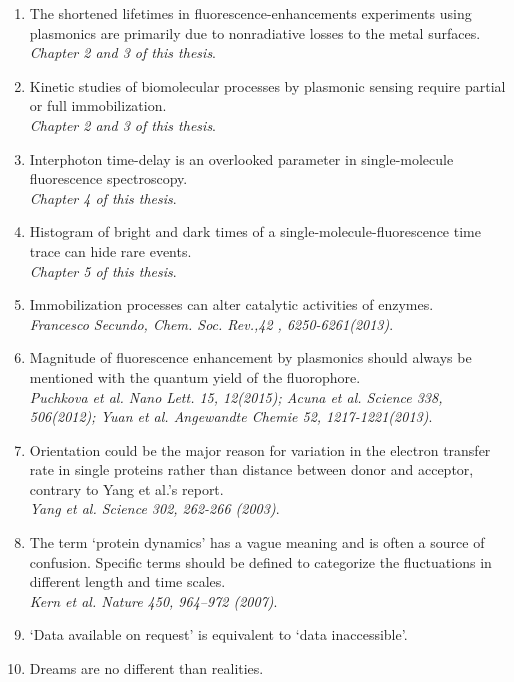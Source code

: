 \documentclass{dissertation}
\begin{document}
\newcommand{\refp}[1]{\\{\it \footnotesize #1}.}
\begin{enumerate}
	\item The shortened lifetimes in fluorescence-enhancements experiments using plasmonics are primarily due to nonradiative losses to the metal surfaces.
	\refp{Chapter 2 and 3 of this thesis}
	
	\item Kinetic studies of biomolecular processes by plasmonic sensing require partial or full immobilization. 
	\refp{Chapter 2 and 3 of this thesis}
	
	\item Interphoton time-delay is an overlooked parameter in single-molecule fluorescence spectroscopy.
	\refp{Chapter 4 of this thesis}
	
	\item Histogram of bright and dark times of a single-molecule-fluorescence time trace can hide rare events.
	\refp{Chapter 5 of this thesis}
	
	\item Immobilization processes can alter catalytic activities of enzymes.
	\refp{Francesco Secundo, Chem. Soc. Rev.,42 , 6250-6261(2013)}
	
	\item Magnitude of fluorescence enhancement by plasmonics should always be mentioned with the quantum yield of the fluorophore.
	\refp{Puchkova et al. Nano Lett. 15, 12(2015);
		  Acuna et al. Science 338, 506(2012);
		  Yuan et al. Angewandte Chemie 52, 1217-1221(2013)}
	
	\item Orientation could be the major reason for variation in the electron transfer rate in single proteins rather than distance between donor and acceptor, contrary to Yang et al.'s report.	
	\refp{Yang et al. Science 302, 262-266 (2003)}
	
	\item The term `protein dynamics' has a vague meaning and is often a source of confusion. Specific terms should be defined to categorize the fluctuations in different length and time scales.
	\refp{Kern et al. Nature 450, 964–972 (2007)}
	
	\item `Data available on request' is equivalent to `data inaccessible'.

	\item Dreams are no different than realities.
\end{enumerate}
\end{document}
